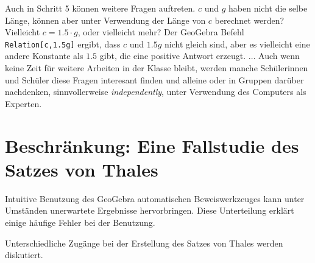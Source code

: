 \documentclass{article}
\begin{document}
Auch in Schritt 5 können weitere Fragen auftreten. $c$ und $g$ haben nicht die selbe Länge, können aber unter Verwendung der Länge von $c$ berechnet werden? Vielleicht $c=1.5\cdot g$, oder vielleicht mehr? Der GeoGebra Befehl \texttt{Relation[c,1.5g]} ergibt, dass $c$ und $1.5g$ nicht gleich sind, aber es vielleicht eine andere Konstante als $1.5$ gibt, die eine positive Antwort erzeugt. $\ldots$ Auch wenn keine Zeit für weitere Arbeiten in der Klasse bleibt, werden manche Schülerinnen und Schüler diese Fragen interesant finden und alleine oder in Gruppen darüber nachdenken, sinnvollerweise  \textit{independently}, unter Verwendung des Computers als Experten.

\section{Beschränkung: Eine Fallstudie des Satzes von Thales}

Intuitive Benutzung des GeoGebra automatischen Beweiswerkzeuges kann unter Umständen unerwartete Ergebnisse hervorbringen. Diese Unterteilung erklärt einige häufige Fehler bei der Benutzung.

Unterschiedliche Zugänge bei der Erstellung des Satzes von Thales werden diskutiert.
\end{document}
